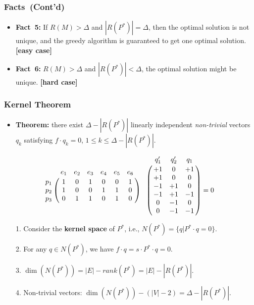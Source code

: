 \frame
{
	\frametitle{Facts~(Cont'd)}

	\vspace{0.3cm}
	\begin{itemize}
	\item<1-> {\bf Fact~5:} If $R(M) > \Delta$ and $|R(P^*)| = \Delta$, then the optimal solution is not unique,
		and the greedy algorithm is guaranteed to get one optimal solution. {\bf [easy case]}
	\end{itemize}

	\vspace{0.5cm}
	

	\vspace{0.4cm}

	\begin{itemize}
	\item<1-> {\bf Fact~6:} $R(M) > \Delta$ and $|R(P^*)| < \Delta$, the optimal solution
		might be unique. {\bf [hard case]} 
	\end{itemize}

	\vspace{0.5cm}
	
	\vspace{-0.1cm}

}

\frame
{
	\frametitle{Kernel Theorem}
	\begin{itemize}
	\item {\bf Theorem:} there exist $\Delta - |R(P^*)|$ linearly independent
	{\it non-trivial} vectors $q_k$ satisfying $f\cdot q_k = 0$, $1\le k\le \Delta - |R(P^*)|$.
	\end{itemize}

	\vspace{0.6cm}

	

	\vspace{-0.5cm}

	\begin{displaymath}
	\bordermatrix{
		~   & e_1 & e_2 & e_3 & e_4 & e_5 & e_6\cr
		p_1 & 1 & 0 & 1 & 0 & 0 & 1 \cr
		p_2 & 1 & 0 & 0 & 1 & 1 & 0 \cr
		p_3 & 0 & 1 & 1 & 0 & 1 & 0 \cr
	} 
	\bordermatrix{
   	   ~& q'_1 & q'_2 & q_1 \cr
		& +1 &  0 & +1  \cr
		& +1 &  0 &  0  \cr
		& -1 & +1 &  0  \cr
		& -1 & +1 & -1  \cr
		&  0 & -1 &  0  \cr
		&  0 & -1 & -1  \cr
	} = 0
	\end{displaymath}

	\begin{itemize}
	\item[1.] Consider the {\bf kernel space} of $P^*$, i.e., $N(P^*) = \{q | P^*\cdot q = 0\}$.
	\item[2.] For any $q\in N(P^*)$, we have $f\cdot q = s\cdot P^* \cdot q = 0$. 
	\item[3.] $\dim(N(P^*)) = |E| - rank(P^*) = |E| - |R(P^*)|$. 
	\item[4.] Non-trivial vectors: $\dim(N(P^*)) - (|V| - 2) = \Delta - |R(P^*)|$. 
	\end{itemize}
}

